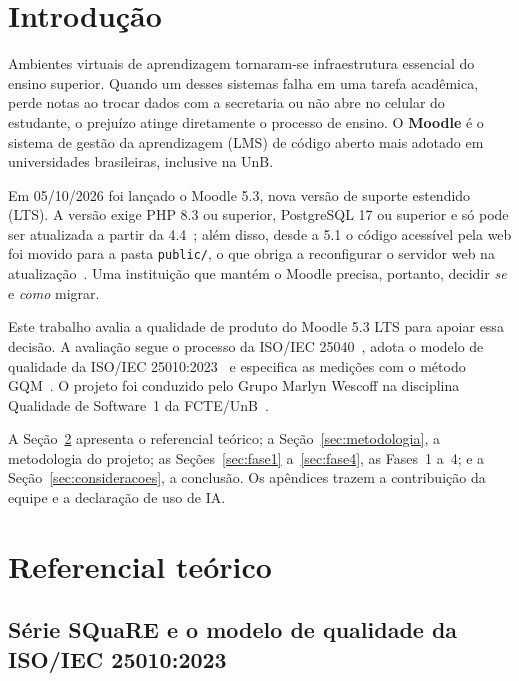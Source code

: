 \documentclass[12pt]{article}
\begin{document}
\section{Introdução}
\label{sec:intro}

Ambientes virtuais de aprendizagem tornaram-se infraestrutura essencial do ensino superior. Quando um desses sistemas falha em uma tarefa acadêmica, perde notas ao trocar dados com a secretaria ou não abre no celular do estudante, o prejuízo atinge diretamente o processo de ensino. O \textbf{Moodle} é o sistema de gestão da aprendizagem (LMS) de código aberto mais adotado em universidades brasileiras, inclusive na UnB.

Em 05/10/2026 foi lançado o Moodle 5.3, nova versão de suporte estendido (LTS). A versão exige PHP 8.3 ou superior, PostgreSQL 17 ou superior e só pode ser atualizada a partir da 4.4~\cite{moodle53}; além disso, desde a 5.1 o código acessível pela web foi movido para a pasta \texttt{public/}, o que obriga a reconfigurar o servidor web na atualização~\cite{moodle51upgrade}. Uma instituição que mantém o Moodle precisa, portanto, decidir \emph{se} e \emph{como} migrar.

Este trabalho avalia a qualidade de produto do Moodle 5.3 LTS para apoiar essa decisão. A avaliação segue o processo da ISO/IEC 25040~\cite{iso25040}, adota o modelo de qualidade da ISO/IEC 25010:2023~\cite{iso25010} e especifica as medições com o método GQM~\cite{basili1994gqm}. O projeto foi conduzido pelo Grupo Marlyn Wescoff na disciplina Qualidade de Software~1 da FCTE/UnB~\cite{ramos2026trabalho}.

A Seção~\ref{sec:referencial} apresenta o referencial teórico; a Seção~\ref{sec:metodologia}, a metodologia do projeto; as Seções~\ref{sec:fase1} a~\ref{sec:fase4}, as Fases~1 a~4; e a Seção~\ref{sec:consideracoes}, a conclusão. Os apêndices trazem a contribuição da equipe e a declaração de uso de IA.

\section{Referencial teórico}
\label{sec:referencial}

\subsection{Série SQuaRE e o modelo de qualidade da ISO/IEC 25010:2023}
\end{document}
